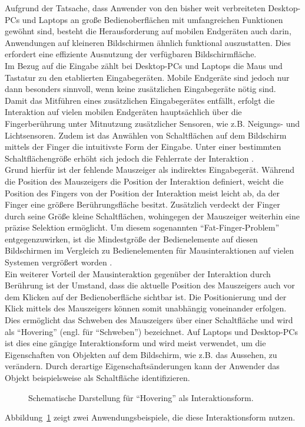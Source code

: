 \documentclass[12pt,numbers=noenddot,parskip,bibliography=totocnumbered,listof=totocnumbered]{scrreprt}
\begin{document}
Aufgrund der Tatsache, dass Anwender von den bisher weit verbreiteten Desktop-PCs und Laptops an große Bedienoberflächen mit umfangreichen Funktionen gewöhnt sind, besteht die Herausforderung auf mobilen Endgeräten auch darin, Anwendungen auf kleineren Bildschirmen ähnlich funktional auszustatten. Dies erfordert eine effiziente Ausnutzung der verfügbaren Bildschirmfläche.\\
Im Bezug auf die Eingabe zählt bei Desktop-PCs und Laptops die Maus und Tastatur zu den etablierten Eingabegeräten. Mobile Endgeräte sind jedoch nur dann besonders sinnvoll, wenn keine zusätzlichen Eingabegeräte nötig sind. Damit das Mitführen eines zusätzlichen Eingabegerätes entfällt, erfolgt die Interaktion auf vielen mobilen Endgeräten hauptsächlich über die Fingerberührung unter Mitnutzung zusätzlicher Sensoren, wie z.B. Neigungs- und Lichtsensoren. Zudem ist das Anwählen von Schaltflächen auf dem Bildschirm mittels der Finger die intuitivste Form der Eingabe. Unter einer bestimmten Schaltflächengröße erhöht sich jedoch die Fehlerrate der Interaktion \citep{mousetouchmk}.\\
Grund hierfür ist der fehlende Mauszeiger als indirektes Eingabegerät. Während die Position des Mauszeigers die Position der Interaktion definiert, weicht die Position des Fingers von der Position der Interaktion meist leicht ab, da der Finger eine größere Berührungsfläche besitzt. Zusätzlich verdeckt der Finger durch seine Größe kleine Schaltflächen, wohingegen der Mauszeiger weiterhin eine präzise Selektion ermöglicht. Um diesem sogenannten "`Fat-Finger-Problem"' \citep{monkeys} entgegenzuwirken, ist die Mindestgröße der Bedienelemente auf diesen Bildschirmen im Vergleich zu Bedienelementen für Mausinteraktionen auf vielen Systemen vergrößert worden \citep{jin}.\\
Ein weiterer Vorteil der Mausinteraktion gegenüber der Interaktion durch Berührung ist der Umstand, dass die aktuelle Position des Mauszeigers auch vor dem Klicken auf der Bedienoberfläche sichtbar ist. Die Positionierung und der Klick mittels des Mauszeigers können somit unabhängig voneinander erfolgen. Dies ermöglicht das Schweben des Mauszeigers über einer Schaltfläche und wird als "`Hovering"' (engl. für "`Schweben"') bezeichnet. Auf Laptops und Desktop-PCs ist dies eine gängige Interaktionsform und wird meist verwendet, um die Eigenschaften von Objekten auf dem Bildschirm, wie z.B. das Aussehen, zu verändern. Durch derartige Eigenschaftsänderungen kann der Anwender das Objekt beispielsweise als Schaltfläche identifizieren.
\begin{figure}
\centering
{}%
\hfill
{}%
\caption{Schematische Darstellung für "`Hovering"' als Interaktionsform.}
\label{hoveringdesktop}
\end{figure}
Abbildung~\ref{hoveringdesktop} zeigt zwei Anwendungsbeispiele, die diese Interaktionsform nutzen.
\end{document}
